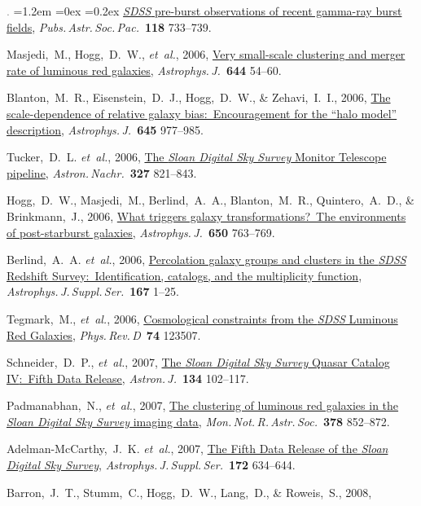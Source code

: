 \documentclass[10pt,letterpaper]{article}
\newcommand{\acronym}[1]{{\small{#1}}}
\newcommand{\foreign}[1]{\textsl{#1}}
\newcommand{\etal}{\foreign{et~al.}}
\newcommand{\project}[1]{\textsl{#1}}
\newcommand{\doi}[2]{\href{http://dx.doi.org/#1}{{#2}}}
\newcommand{\deemph}[1]{\textcolor{grey}{\footnotesize{#1}}}
\newcommand{\pubnumber}[1]{\deemph{{#1}.}}
\newcounter{refpubnum}
\newcommand{\hogglist}{%
    \rightmargin=0in
    \leftmargin=1.2em
    \topsep=0ex
    \partopsep=0pt
    \itemsep=0.2ex
    \parsep=0pt
    \itemindent=-1.0\leftmargin
    \listparindent=0.0\leftmargin
    \settowidth{\labelsep}{~}
    \usecounter{refpubnum}
  }
\begin{document}
\begin{list}{\pubnumber{\therefpubnum}}{\hogglist}
\doi{10.1086/503334}{\project{\acronym{SDSS}} pre-burst observations of recent gamma-ray burst fields},
\textit{Pubs.\,Astr.\,Soc.\,Pac.}\ \textbf{118} 733--739.
\item\label{pub:Masjedi2006}
Masjedi,~M., Hogg,~D.~W., \etal, 2006,
\doi{10.1086/503536}{Very small-scale clustering and merger rate of luminous red galaxies},
\textit{Astrophys.\,J.}\ \textbf{644} 54--60.
\item
Blanton,~M.~R., Eisenstein,~D.~J., Hogg,~D.~W., \& Zehavi,~I.~I., 2006,
\doi{10.1086/500918}{The scale-dependence of relative galaxy bias:\ Encouragement for the ``halo model'' description},
\textit{Astrophys.\,J.}\ \textbf{645}
977--985.
\item
Tucker,~D.~L. \etal, 2006,
\doi{10.1002/asna.200610655}{The \project{Sloan Digital Sky Survey} Monitor Telescope pipeline},
\textit{Astron.\,Nachr.}\ \textbf{327} 821--843.
\item
Hogg,~D.~W., Masjedi,~M., Berlind,~A.~A., Blanton,~M.~R., Quintero,~A.~D., \& Brinkmann,~J., 2006,
\doi{10.1086/507172}{What triggers galaxy transformations?\ The environments of post-starburst galaxies},
\textit{Astrophys.\,J.}\ \textbf{650} 763--769.
\item
Berlind,~A.~A. \etal, 2006,
\doi{10.1086/508170}{Percolation galaxy groups and clusters in the \project{\acronym{SDSS}} Redshift Survey:\ Identification, catalogs, and the multiplicity function},
\textit{Astrophys.\,J.\,Suppl.\,Ser.}\ \textbf{167} 1--25.
\item
Tegmark,~M., \etal, 2006,
\doi{10.1103/PhysRevD.74.123507}{Cosmological constraints from the \project{\acronym{SDSS}} Luminous Red Galaxies},
\textit{Phys.\,Rev.\,D}\ \textbf{74} 123507.
\item
Schneider,~D.~P., \etal, 2007,
\doi{10.1086/518474}{The \project{Sloan Digital Sky Survey} Quasar Catalog \acronym{IV}:\ Fifth Data Release},
\textit{Astron.\,J.}\ \textbf{134} 102--117.
\item
Padmanabhan,~N., \etal, 2007,
\doi{10.1111/j.1365-2966.2007.11593.x}{The clustering of luminous red galaxies in the \project{Sloan Digital Sky Survey} imaging data},
\textit{Mon.\,Not.\,R.\,Astr.\,Soc.}\ \textbf{378} 852--872.
\item
Adelman-McCarthy,~J.~K. \etal, 2007,
\doi{10.1086/518864}{The Fifth Data Release of the \project{Sloan Digital Sky Survey}},
\textit{Astrophys.\,J.\,Suppl.\,Ser.}\ \textbf{172} 634--644.
\item
Barron,~J.~T., Stumm,~C., Hogg,~D.~W., Lang,~D., \& Roweis,~S., 2008,

\end{list}
\end{document}
